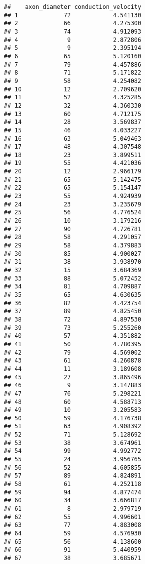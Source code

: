 \documentclass[
]{article}
\begin{document}
\begin{verbatim}
##    axon_diameter conduction_velocity
## 1             72            4.541130
## 2             66            4.275300
## 3             74            4.912093
## 4              9            2.872806
## 5              9            2.395194
## 6             65            5.120160
## 7             79            4.457886
## 8             71            5.171822
## 9             58            4.254082
## 10            12            2.709620
## 11            52            4.325285
## 12            32            4.360330
## 13            60            4.712175
## 14            28            3.569837
## 15            46            4.033227
## 16            63            5.049463
## 17            48            4.307548
## 18            23            3.899511
## 19            55            4.421036
## 20            12            2.966179
## 21            65            5.142475
## 22            65            5.154147
## 23            55            4.924939
## 24            23            3.235679
## 25            56            4.776524
## 26            10            3.179216
## 27            90            4.726781
## 28            58            4.291057
## 29            58            4.379883
## 30            85            4.900027
## 31            38            3.938970
## 32            15            3.684369
## 33            88            5.072452
## 34            81            4.709887
## 35            65            4.630635
## 36            82            4.423754
## 37            89            4.825450
## 38            72            4.897530
## 39            73            5.255260
## 40            57            4.351882
## 41            50            4.780395
## 42            79            4.569002
## 43            61            4.260878
## 44            11            3.189608
## 45            27            3.865496
## 46             9            3.147883
## 47            76            5.298221
## 48            60            4.588713
## 49            10            3.205583
## 50            59            4.176738
## 51            63            4.908392
## 52            71            5.128692
## 53            38            3.674961
## 54            99            4.992772
## 55            24            3.956765
## 56            52            4.605855
## 57            89            4.824891
## 58            61            4.252118
## 59            94            4.877474
## 60            34            3.666817
## 61             8            2.979719
## 62            55            4.996601
## 63            77            4.883008
## 64            59            4.576930
## 65            56            4.138600
## 66            91            5.440959
## 67            38            3.685671
\end{verbatim}
\end{document}
